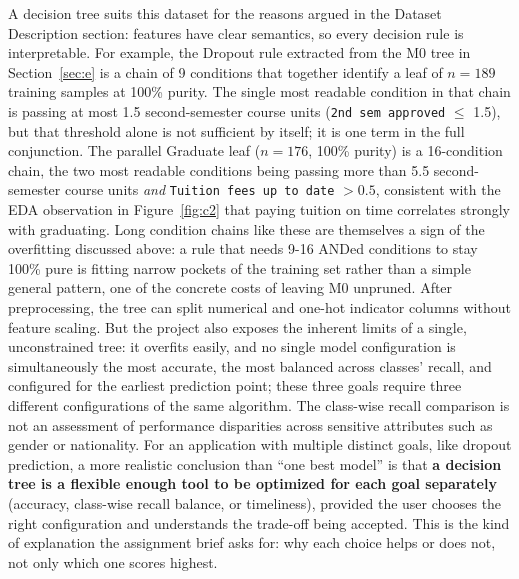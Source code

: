 A decision tree suits this dataset for the reasons argued in the Dataset
Description section: features have clear semantics, so every decision
rule is interpretable. For example, the Dropout rule extracted from the
M0 tree in Section~\ref{sec:e} is a chain of 9 conditions that together
identify a leaf of $n=189$ training samples at 100\% purity. The single
most readable condition in that chain is passing at most 1.5
second-semester course units (\texttt{2nd sem approved} $\le$ 1.5), but
that threshold alone is not sufficient by itself; it is one term in the
full conjunction. The parallel Graduate leaf ($n=176$, 100\% purity) is
a 16-condition chain, the two most readable conditions being passing
more than 5.5 second-semester course units \emph{and}
\texttt{Tuition fees up to date} $> 0.5$, consistent with the EDA
observation in Figure~\ref{fig:c2} that paying tuition on time
correlates strongly with graduating. Long condition chains like these
are themselves a sign of the overfitting discussed above: a rule that
needs 9-16 ANDed conditions to stay 100\% pure is fitting narrow
pockets of the training set rather than a simple general pattern, one of
the concrete costs of leaving M0 unpruned. After preprocessing, the tree
can split numerical and one-hot indicator columns without feature
scaling. But the project also exposes the inherent limits of a single,
unconstrained tree: it overfits easily, and no single model
configuration is simultaneously the most accurate, the most balanced
across classes' recall, and configured for the earliest prediction point;
these three goals require three different configurations of the same
algorithm. The class-wise recall comparison is not an assessment of
performance disparities across sensitive attributes such as gender or
nationality. For an application with multiple distinct goals, like
dropout prediction, a more realistic conclusion than ``one best model''
is that \textbf{a decision tree is a flexible enough tool to be
optimized for each goal separately} (accuracy, class-wise recall
balance, or timeliness), provided the user chooses the right
configuration and understands the trade-off being accepted. This is the
kind of explanation the assignment brief asks for: why each choice helps
or does not, not only which one scores highest.
